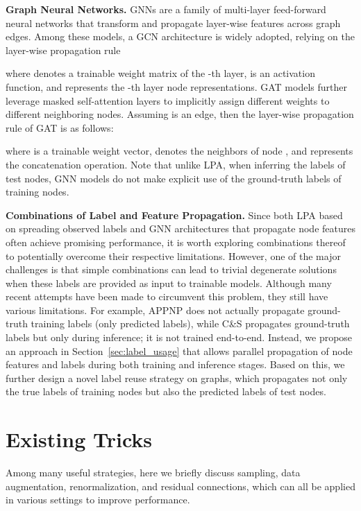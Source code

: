 \documentclass[sigconf,screen,nonacm]{acmart} \usepackage{booktabs}
\newcommand{\minisection}[1]{\vspace{5pt}\noindent\textbf{#1.}}
\begin{document}
	\minisection{Graph Neural Networks}
	GNNs are a family of multi-layer feed-forward neural networks that transform and propagate layer-wise features across graph edges.
	Among these models, a GCN architecture is widely adopted, relying on the layer-wise propagation rule
	
	where  denotes a trainable weight matrix of the -th layer,  is an activation function, and  represents the -th layer node representations.
	GAT models further leverage masked self-attention layers to implicitly assign different weights to different neighboring nodes.
	Assuming  is an edge, then the layer-wise propagation rule of GAT is as follows:
    
where  is a trainable weight vector,  denotes the neighbors of node , and  represents the concatenation operation.  Note that unlike LPA, when inferring the labels of test nodes, GNN models do not make explicit use of the ground-truth labels of training nodes.
	
	\minisection{Combinations of Label and Feature Propagation}
	Since both LPA based on spreading observed labels and GNN architectures that propagate node features often achieve promising performance, it is worth exploring combinations thereof to potentially overcome their respective limitations.
However, one of the major challenges is that simple combinations can lead to trivial degenerate solutions when these labels are provided as input to trainable models. 
    Although many recent attempts have been made to circumvent this problem, they still have various limitations.  For example, APPNP \citep{klicpera2018predict} does not actually propagate ground-truth training labels (only predicted labels), while C\&S \citep{huang2020combining} propagates ground-truth labels but only during inference; it is not trained end-to-end.
Instead, we propose an approach in Section~\ref{sec:label_usage} that allows parallel propagation of node features and labels during both training and inference stages.
Based on this, we further design a novel label reuse strategy on graphs, which propagates not only the true labels of training nodes but also the predicted labels of test nodes.
	
	\section{Existing Tricks}
Among many useful strategies, here we briefly discuss sampling, data augmentation, renormalization, and residual connections, which can all be applied in various settings to improve performance.
\end{document}
